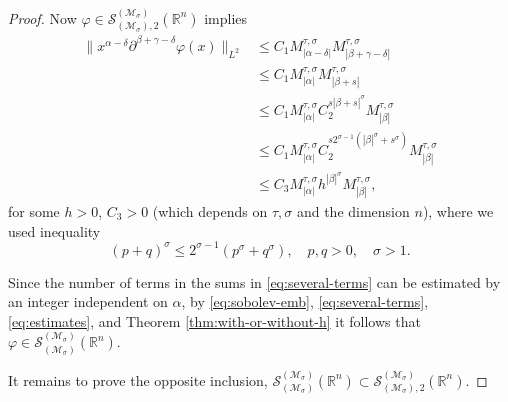 \documentclass{article}
\theoremstyle{thmstyleone}
\theoremstyle{thmstyletwo}%
\theoremstyle{thmstylethree}%
\begin{document}
\begin{proof}
Now $ \varphi \in  \mathcal S_{(\mathcal{M}_\sigma ),2 }^{ (\mathcal{M}_\sigma )} (\mathbb R^n) $ implies
\begin{align}
\| x^{\alpha - \delta} \partial ^{\beta + \gamma - \delta}  \varphi(x)\|_{L^2} 
&\leq 
C_1  M^{\tau,\sigma}_{|\alpha - \delta|}    M^{\tau,\sigma}_{|\beta + \gamma - \delta|} \nonumber
\\
&\leq 
C_1  M^{\tau,\sigma}_{|\alpha| }    M^{\tau,\sigma}_{|\beta + s|} \nonumber \\
&\leq 
C_1  M^{\tau,\sigma}_{|\alpha |}  C_2 ^{s |\beta +s|^\sigma}  M^{\tau,\sigma}_{|\beta|} \nonumber \\
& \leq
C_1  M^{\tau,\sigma}_{|\alpha |}  C_2 ^{s 2^{\sigma - 1}(|\beta |^\sigma + s^\sigma)}  M^{\tau,\sigma}_{|\beta|} \nonumber \\
& \leq
C_{3}  M^{\tau,\sigma}_{|\alpha |}  h^{|\beta |^\sigma }  M^{\tau,\sigma}_{|\beta|}, 
\label{eq:estimates}
\end{align}
for some $h>0$, $C_3 >0$ (which depends on $\tau, \sigma$ and the dimension $n$),
where we used inequality
\begin{equation} \label{eq:inequ-powers-of-sigma}
(p+q)^\sigma 
\leq 2^{\sigma - 1}(p^\sigma +q^\sigma), \quad  p,q>0, \quad \sigma>1.    
\end{equation}

Since the number of terms in the sums in \eqref{eq:several-terms} 
can be estimated by an integer independent on $ \alpha$,
by \eqref{eq:sobolev-emb}, \eqref{eq:several-terms}, \eqref{eq:estimates},  and 
Theorem \ref{thm:with-or-without-h} it follows that 
$\varphi \in \mathcal S_{(\mathcal{M}_\sigma ) }^{ (\mathcal{M}_\sigma)} (\mathbb R^n)$.

It remains to prove the opposite inclusion,
$ \mathcal S_{(\mathcal{M}_\sigma ) }^{ (\mathcal{M}_\sigma)} (\mathbb R^n)
\subset 
\mathcal S_{(\mathcal{M}_\sigma ),2 }^{ (\mathcal{M}_\sigma )} (\mathbb R^n).
$


\end{proof}
\end{document}
